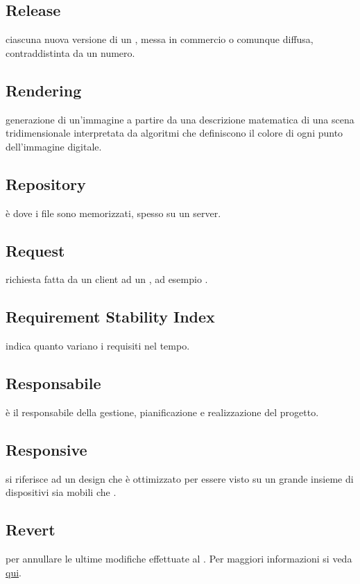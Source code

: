 \documentclass[12pt,a4paper]{article}
\begin{document}
\subsection{Release} 
ciascuna nuova versione di un , messa in commercio o comunque diffusa, contraddistinta da un numero.

\subsection{Rendering} 
generazione di un'immagine a partire da una descrizione matematica di una scena tridimensionale interpretata da algoritmi che definiscono il colore di ogni punto dell'immagine digitale.

\subsection{Repository} 
è dove i file sono memorizzati, spesso su un server.

\subsection{Request} 
richiesta fatta da un client ad un , ad esempio .

\subsection{Requirement Stability Index} 
indica quanto variano i requisiti nel tempo.

\subsection{Responsabile} 
è il responsabile della gestione, pianificazione e realizzazione del progetto.

\subsection{Responsive} 
si riferisce ad un design che è ottimizzato per essere visto su un grande insieme di dispositivi sia mobili che .

\subsection{Revert} 
per annullare le ultime modifiche effettuate al . Per maggiori informazioni si veda \href{https://git-scm.com/docs/}{qui}.
\end{document}
